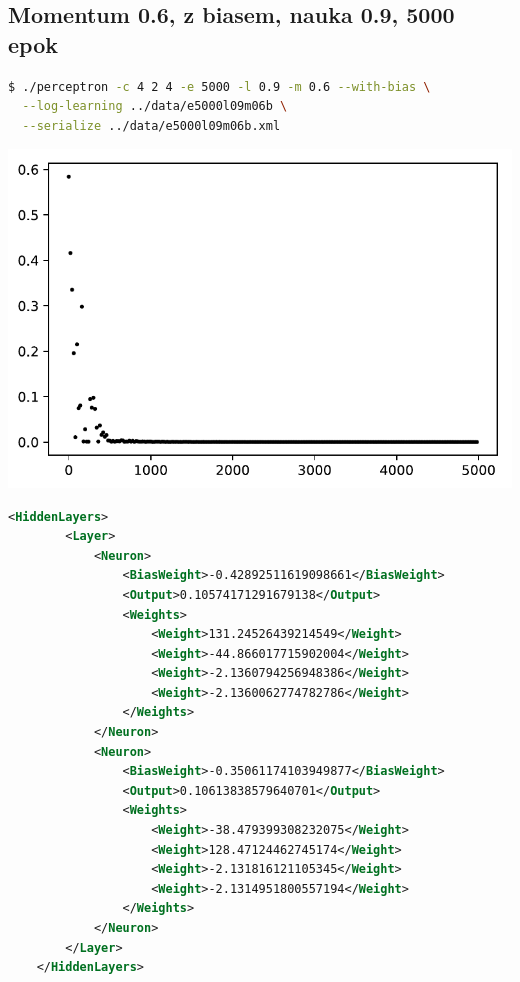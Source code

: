 \documentclass{classrep}
\begin{document}
\subsection{Momentum 0.6, z biasem, nauka 0.9, 5000 epok}
\begin{lstlisting}[language=bash]
$ ./perceptron -c 4 2 4 -e 5000 -l 0.9 -m 0.6 --with-bias \
  --log-learning ../data/e5000l09m06b \
  --serialize ../data/e5000l09m06b.xml
\end{lstlisting}
\begin{center}
 \includegraphics{sprawozdanie/output_0_17.pdf}
\end{center}
\begin{lstlisting}[language=xml]
     <HiddenLayers>
        <Layer>
            <Neuron>
                <BiasWeight>-0.42892511619098661</BiasWeight>
                <Output>0.10574171291679138</Output>
                <Weights>
                    <Weight>131.24526439214549</Weight>
                    <Weight>-44.866017715902004</Weight>
                    <Weight>-2.1360794256948386</Weight>
                    <Weight>-2.1360062774782786</Weight>
                </Weights>
            </Neuron>
            <Neuron>
                <BiasWeight>-0.35061174103949877</BiasWeight>
                <Output>0.10613838579640701</Output>
                <Weights>
                    <Weight>-38.479399308232075</Weight>
                    <Weight>128.47124462745174</Weight>
                    <Weight>-2.131816121105345</Weight>
                    <Weight>-2.1314951800557194</Weight>
                </Weights>
            </Neuron>
        </Layer>
    </HiddenLayers>
\end{lstlisting}
\clearpage
\end{document}
